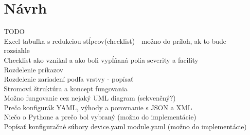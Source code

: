 \chapter{Návrh}
{}
TODO\\
Excel tabuľka s redukciou stĺpcov(checklist) - možno do príloh, ak to bude rozsiahle\\
Checklist ako vznikal a ako boli vypĺňaná polia severity a facility\\
Rozdelenie príkazov\\
Rozdelenie zariadení podľa vrstvy - popísať\\
Stromová štruktúra a koncept fungovania\\
Možno fungovanie cez nejaký UML diagram (sekvenčný?)\\
Prečo konfigurák YAML, výhody a porovnanie s JSON a XML\\
Niečo o Pythone a prečo bol vybraný (možno do implementácie)\\
Popísať konfiguračné súbory device.yaml module.yaml (možno do implementácie)\\
